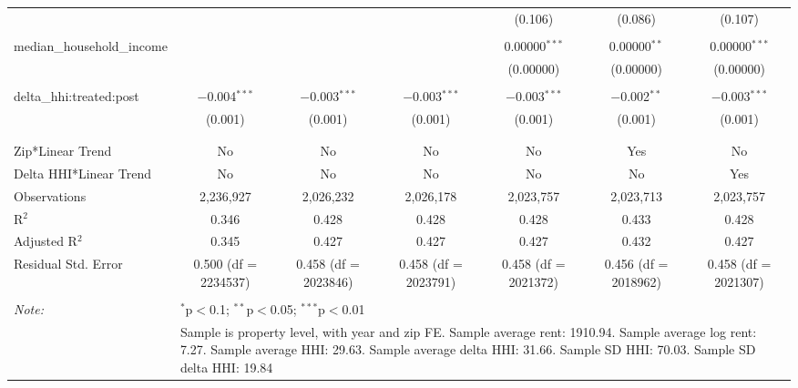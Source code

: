 \begin{table}[H]
{\begin{tabular}{@{\extracolsep{5pt}}lcccccc}
   &  &  &  & (0.106) & (0.086) & (0.107) \\  

   & & & & & & \\  

  median\_household\_income &  &  &  & 0.00000$^{***}$ & 0.00000$^{**}$ & 0.00000$^{***}$ \\  

   &  &  &  & (0.00000) & (0.00000) & (0.00000) \\  

   & & & & & & \\  

  delta\_hhi:treated:post & $-$0.004$^{***}$ & $-$0.003$^{***}$ & $-$0.003$^{***}$ & $-$0.003$^{***}$ & $-$0.002$^{**}$ & $-$0.003$^{***}$ \\  

   & (0.001) & (0.001) & (0.001) & (0.001) & (0.001) & (0.001) \\  

   & & & & & & \\  

 \hline \\[-1.8ex]  

 Zip*Linear Trend & No & No & No & No & Yes & No \\  

 Delta HHI*Linear Trend & No & No & No & No & No & Yes \\  

 Observations & 2,236,927 & 2,026,232 & 2,026,178 & 2,023,757 & 2,023,713 & 2,023,757 \\  

 R$^{2}$ & 0.346 & 0.428 & 0.428 & 0.428 & 0.433 & 0.428 \\  

 Adjusted R$^{2}$ & 0.345 & 0.427 & 0.427 & 0.427 & 0.432 & 0.427 \\  

 Residual Std. Error & 0.500 (df = 2234537) & 0.458 (df = 2023846) & 0.458 (df = 2023791) & 0.458 (df = 2021372) & 0.456 (df = 2018962) & 0.458 (df = 2021307) \\  

 \hline  

 \hline \\[-1.8ex]  

 \textit{Note:}  & \multicolumn{6}{l}{$^{*}$p$<$0.1; $^{**}$p$<$0.05; $^{***}$p$<$0.01} \\  

  & \multicolumn{6}{l}{Sample is property level, with year and zip FE. Sample average rent: 1910.94. Sample average log rent: 7.27. Sample average HHI: 29.63. Sample average delta HHI: 31.66. Sample SD HHI: 70.03. Sample SD delta HHI: 19.84} \\  

 \end{tabular}}  

 \end{table}  

